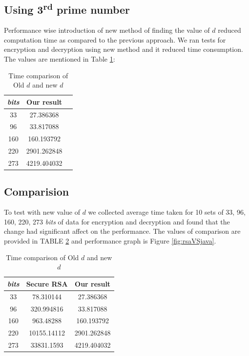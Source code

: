 \documentclass[12pt,journal,compsoc]{IEEEtran}
\begin{document}
\subsection{Using 3\textsuperscript{rd} prime number}
Performance wise introduction of new method of finding the value of $d$ reduced computation time as compared to the previous approach. We ran tests for encryption and decryption using new method and it reduced time consumption. The values are mentioned in Table \ref{table:4.2}:
\begin{table}[ht]
	\begin{center}
	\begin{tabular}{|c|c|c|}
    	\hline
       		\emph{bits}	&		Our result\\
	\hline
    		33			&	27.386368\\
		96			&	33.817088\\
		160			&	160.193792\\
		220			&	2901.262848\\
		273			&	4219.404032\\
	\hline
	\end{tabular}
	\end{center}
	\caption{Time comparison of Old $d$ and new $d$}
	\label{table:4.2}
\end{table}

\subsection{Comparision}
To test with new value of $d$ we collected average time taken for 10 sets of 33, 96, 160, 220, 273 \emph{bits} of data for encryption and decryption and found that the change had significant affect on the performance. The values of comparison are provided in TABLE \ref{table:rsaVSjava} and performance graph is Figure \ref{fig:rsaVSjava}.

\begin{table}[ht]
	\begin{center}
	\begin{tabular}{|c|c|c|}
    	\hline
       		\emph{bits}	&		Secure RSA		&	Our result\\
	\hline
    		33			&	78.310144	&	27.386368\\
		96			&	320.994816	&	33.817088\\
		160			&	963.48288	&	160.193792\\
		220			&	10155.14112	&	2901.262848\\
		273			&	33831.1593	&	4219.404032\\
	\hline
	\end{tabular}
	\end{center}
	\caption{Time comparison of Old $d$ and new $d$}
	\label{table:rsaVSjava}
\end{table}
\end{document}
